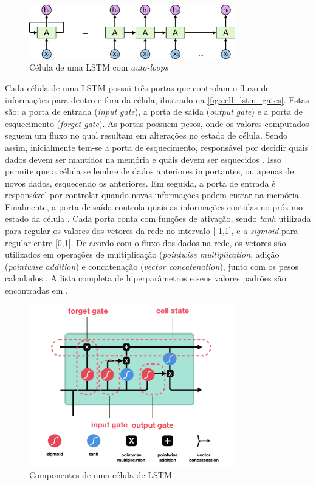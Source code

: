 \begin{figure}[h]
  \centering
  \caption{Célula de uma LSTM com \textit{auto-loops}}
   \label{fig:cell_lstm}
   \includegraphics[width=0.8\textwidth]{figuras/fig_8.png}
\end{figure}

Cada célula de uma LSTM possui três portas que controlam o fluxo de informações para dentro e fora da célula, ilustrado na \autoref{fig:cell_lstm_gates}. Estas são: a porta de entrada (\textit{input gate}), a porta de saída (\textit{output gate}) e a porta de esquecimento (\textit{forget gate}). As portas possuem pesos, onde os valores computados seguem um fluxo no qual resultam em alterações no estado de célula. Sendo assim, inicialmente tem-se a porta de esquecimento, responsável por decidir quais dados devem ser mantidos na memória e quais devem ser esquecidos \cite{Phi2020}. Isso permite que a célula se lembre de dados anteriores importantes, ou apenas de novos dados, esquecendo os anteriores. Em seguida, a porta de entrada é responsável por controlar quando novas informações podem entrar na memória. Finalmente, a porta de saída controla quais as informações contidas no próximo estado da célula \cite{Jones2017}. Cada porta conta com funções de ativação, sendo \textit{tanh} utilizada para regular os valores dos vetores da rede no intervalo [-1,1], e a \textit{sigmoid} para regular entre [0,1]. De acordo com o fluxo dos dados na rede, os vetores são utilizados em operações de multiplicação (\textit{pointwise multiplication}, adição (\textit{pointwise addition}) e concatenação (\textit{vector concatenation}), junto com os pesos calculados \cite{Phi2020}. A lista completa de hiperparâmetros e seus valores padrões são encontradas em .

\begin{figure}[h]
  \centering
  \caption{Componentes de uma célula de LSTM}
   \label{fig:cell_lstm_gates}
   \includegraphics[width=0.8\textwidth]{figuras/fig_9.png}
\end{figure}

